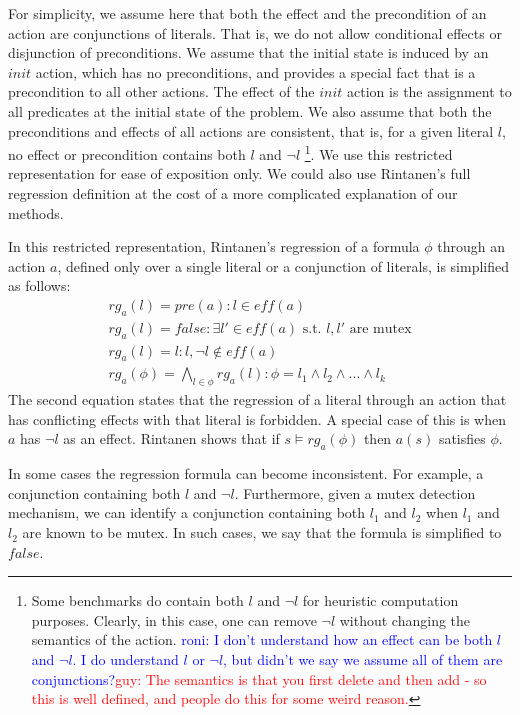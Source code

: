 \documentclass[letterpaper]{article}
\newcommand\roni[1]{\textcolor{blue}{roni: #1}}
\newcommand\guy[1]{\textcolor{red}{guy: #1}}
\theoremstyle{definition}
\begin{document}
For simplicity, we assume here that both the effect and the precondition of an action are conjunctions of literals. That is, we do not allow conditional effects or disjunction of preconditions. We assume that the initial state is induced by an $init$ action, which has no preconditions, and provides a special fact that is a precondition to all other actions. The effect of the $init$ action is the assignment to all predicates at the initial state of the problem. We also assume that both the preconditions and effects of all actions are consistent, that is, for a given literal $l$, no effect or precondition contains both $l$ and $\neg l$ \footnote{Some benchmarks do contain both $l$ and $\neg l$ for heuristic computation purposes. Clearly, in this case, one can remove $\neg l$ without changing the semantics of the action. \roni{I don't understand how an effect can be both $l$ and $\neg l$. I do understand $l$ or $\neg l$, but didn't we say we assume all of them are conjunctions?}\guy{The semantics is that you first delete and then add - so this is well defined, and people do this for some weird reason.}}. We use this restricted representation for ease of exposition only. We could also use Rintanen's full regression definition at the cost of a more complicated explanation of our methods.

In this restricted representation, Rintanen's regression of a formula $\phi$ through an action $a$, defined only over a single literal or a conjunction of literals, is simplified as follows: %
\begin{align}
&rg_a(l)=  pre(a)  :  l \in eff(a)&\\
&rg_a(l)= false   :  \exists l' \in eff(a) \mbox{ s.t. } l,l' \mbox{ are mutex}&\\
&rg_a(l)= l  :  l,\neg l \not\in eff(a)&\\
&rg_a(\phi)=  \bigwedge_{l \in \phi} rg_a(l)  :  \phi = l_1 \wedge l_2 \wedge ... \wedge l_k &
\end{align}
The second equation states that the regression of a literal through an action that has conflicting effects with that literal is forbidden. A special case of this is when $a$ has $\neg l$ as an effect. Rintanen shows that if $s \models rg_a(\phi)$ then $a(s)$ satisfies $\phi$. 

In some cases the regression formula can become inconsistent. For example, a conjunction containing both $l$ and $\neg l$. Furthermore, given a mutex detection mechanism, we can identify a conjunction containing both $l_1$ and $l_2$ when $l_1$ and $l_2$ are known to be mutex. In such cases, we say that the formula is simplified to $false$. 
\end{document}
